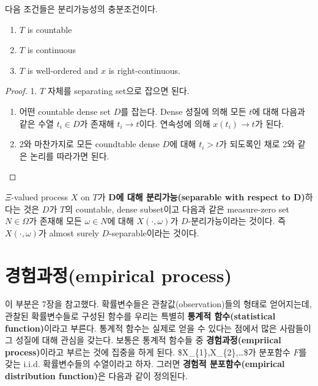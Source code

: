 \documentclass[b5paper,]{scrbook}
\theoremstyle{plain}
\theoremstyle{definition}
\numberwithin{equation}{section}
\let\BeginKnitrBlock\begin \let\EndKnitrBlock\end
\begin{document}
\BeginKnitrBlock{lemma}
\protect\hypertarget{lem:unnamed-chunk-146}{}{\label{lem:unnamed-chunk-146} }다음 조건들은 분리가능성의 충분조건이다.

\begin{enumerate}
\def\labelenumi{\arabic{enumi}.}
\item
  \(T\) is countable
\item
  \(T\) is continuous
\item
  \(T\) is well-ordered and \(x\) is right-continuous.
\end{enumerate}
\EndKnitrBlock{lemma}

\BeginKnitrBlock{proof}
{}1. \(T\) 자체를 separating set으로 잡으면 된다.

\begin{enumerate}
\def\labelenumi{\arabic{enumi}.}
\setcounter{enumi}{1}
\item
  어떤 countable dense set \(D\)를 잡는다. Dense 성질에 의해 모든 \(t\)에 대해 다음과 같은 수열 \(t_{i}\in D\)가 존재해 \(t_{i}\rightarrow t\)이다. 연속성에 의해 \(x(t_{i})\rightarrow t\)가 된다.
\item
  2와 마찬가지로 모든 coundtable dense \(D\)에 대해 \(t_{i}>t\)가 되도록인 채로 2와 같은 논리를 따라가면 된다.
\end{enumerate}
\EndKnitrBlock{proof}

\BeginKnitrBlock{definition}[분리가능 과정]
\protect\hypertarget{def:unnamed-chunk-148}{}{\label{def:unnamed-chunk-148} {} }\(\Xi\)-valued process \(X\) on \(T\)가 \textbf{D에 대해 분리가능(separable with respect to D)}하다는 것은 \(D\)가 \(T\)의 countable, dense subset이고 다음과 같은 measure-zero set \(N\in\Omega\)가 존재해 모든 \(\omega \in N\)에 대해 \(X(\cdot, \omega)\)가 \(D\)-분리가능이라는 것이다. 즉 \(X(\cdot, \omega)\)가 almost surely \(D\)-separable이라는 것이다.
\EndKnitrBlock{definition}

\hypertarget{empirical-process}{%
\section{경험과정(empirical process)}\label{empirical-process}}

이 부분은 \citep{Jiang2010} 7장을 참고했다. 확률변수들은 관찰값(observation)들의 형태로 얻어지는데, 관찰된 확률변수들로 구성된 함수를 우리는 특별히 \textbf{통계적 함수(statistical function)}이라고 부른다. 통계적 함수는 실제로 얻을 수 있다는 점에서 많은 사람들이 그 성질에 대해 관심을 갖는다. 보통은 통계적 함수들 중 \textbf{경험과정(empriical process)}이라고 부르는 것에 집중을 하게 된다. \$X\_\{1\},X\_\{2\},\ldots \$가 분포함수 \(F\)를 갖는 i.i.d. 확률변수들의 수열이라고 하자. 그러면 \textbf{경험적 분포함수(empirical distribution function)}은 다음과 같이 정의된다.
\end{document}
